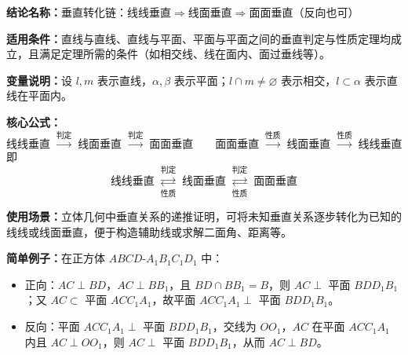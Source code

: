 \textbf{结论名称：}垂直转化链：线线垂直$\Rightarrow$线面垂直$\Rightarrow$面面垂直（反向也可）

\textbf{适用条件：}直线与直线、直线与平面、平面与平面之间的垂直判定与性质定理均成立，且满足定理所需的条件（如相交线、线在面内、面过垂线等）。

\textbf{变量说明：}设 $l,m$ 表示直线，$\alpha,\beta$ 表示平面；$l\cap m\neq\varnothing$ 表示相交，$l\subset\alpha$ 表示直线在平面内。

\textbf{核心公式：}
\[
\boxed{\text{线线垂直}\;\xrightarrow{\text{判定}}\;\text{线面垂直}\;\xrightarrow{\text{判定}}\;\text{面面垂直}}
\qquad
\boxed{\text{面面垂直}\;\xrightarrow{\text{性质}}\;\text{线面垂直}\;\xrightarrow{\text{性质}}\;\text{线线垂直}}
\]
即
\[
\boxed{\text{线线垂直}\;\underset{\text{性质}}{\overset{\text{判定}}{\rightleftarrows}}\;\text{线面垂直}\;\underset{\text{性质}}{\overset{\text{判定}}{\rightleftarrows}}\;\text{面面垂直}}
\]

\textbf{使用场景：}立体几何中垂直关系的递推证明，可将未知垂直关系逐步转化为已知的线线或线面垂直，便于构造辅助线或求解二面角、距离等。

\textbf{简单例子：}在正方体 $ABCD$-$A_1B_1C_1D_1$ 中：
\begin{itemize}
\item 正向：$AC\perp BD$，$AC\perp BB_1$，且 $BD\cap BB_1=B$，则 $AC\perp$ 平面 $BDD_1B_1$；又 $AC\subset$ 平面 $ACC_1A_1$，故平面 $ACC_1A_1\perp$ 平面 $BDD_1B_1$。
\item 反向：平面 $ACC_1A_1\perp$ 平面 $BDD_1B_1$，交线为 $OO_1$，$AC$ 在平面 $ACC_1A_1$ 内且 $AC\perp OO_1$，则 $AC\perp$ 平面 $BDD_1B_1$，从而 $AC\perp BD$。
\end{itemize}